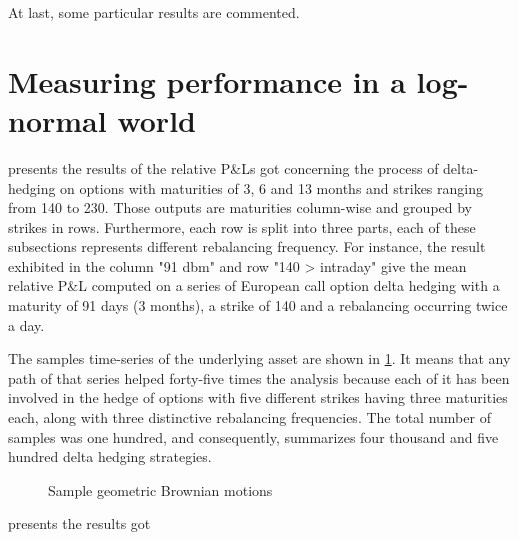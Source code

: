 \documentclass[12pt]{report}
\begin{document}
At last, some particular results are commented.





\section{Measuring performance in a log-normal world}
\label{sec:section name}

 presents the results of the relative P\&Ls got concerning the process of delta-hedging on options with maturities of 3, 6 and 13 months and strikes ranging from 140 to 230.
Those outputs are maturities column-wise and grouped by strikes in rows.
Furthermore, each row is split into three parts, each of these subsections represents different rebalancing frequency.
For instance, the result exhibited in the column "91 dbm" and row "140 > intraday" give the mean relative P\&L computed on a series of European call option delta hedging with a maturity of 91 days (3 months), a strike of 140 and a rebalancing occurring twice a day.

The samples time-series of the underlying asset are shown in \cref{p:analysis:gbm:100}. 
It means that any path of that series helped forty-five times the analysis because each of it has been involved in the hedge of options with five different strikes having three maturities each, along with three distinctive rebalancing frequencies.
The total number of samples was one hundred, and consequently,  summarizes four thousand and  five hundred delta hedging strategies.

\begin{figure}[ht]
  \centering
  
  \caption{Sample geometric Brownian motions}
  \label{p:analysis:gbm:100}
\end{figure}



 presents the results got 
\end{document}
